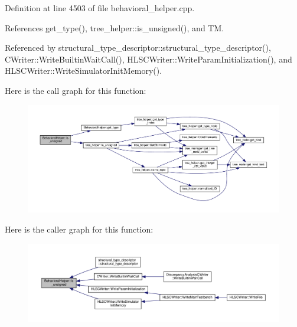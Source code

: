 Definition at line 4503 of file behavioral\+\_\+helper.\+cpp.



References get\+\_\+type(), tree\+\_\+helper\+::is\+\_\+unsigned(), and TM.



Referenced by structural\+\_\+type\+\_\+descriptor\+::structural\+\_\+type\+\_\+descriptor(), C\+Writer\+::\+Write\+Builtin\+Wait\+Call(), H\+L\+S\+C\+Writer\+::\+Write\+Param\+Initialization(), and H\+L\+S\+C\+Writer\+::\+Write\+Simulator\+Init\+Memory().

Here is the call graph for this function\+:
\nopagebreak
\begin{figure}[H]
\begin{center}
\leavevmode
\includegraphics[width=350pt]{dd/db2/classBehavioralHelper_a3f1e46296fca88d2d3cf26c121cd7c0d_cgraph}
\end{center}
\end{figure}
Here is the caller graph for this function\+:
\nopagebreak
\begin{figure}[H]
\begin{center}
\leavevmode
\includegraphics[width=350pt]{dd/db2/classBehavioralHelper_a3f1e46296fca88d2d3cf26c121cd7c0d_icgraph}
\end{center}
\end{figure}
\mbox{\label{classBehavioralHelper_a48be8bee053a0b3d8e4f37b7f249ced2}} 
